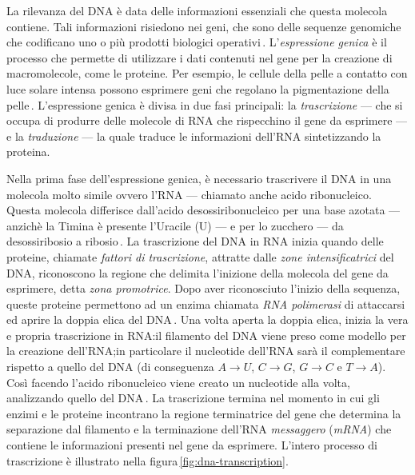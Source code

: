 La rilevanza del DNA è data delle informazioni essenziali che questa molecola contiene. Tali informazioni risiedono nei geni, che sono delle sequenze genomiche che codificano uno o più prodotti biologici operativi\,\cite{gerstein2007gene}. L'\textsl{espressione genica} è il processo che permette di utilizzare i dati contenuti nel gene per la creazione di macromolecole, come le proteine. Per esempio, le cellule della pelle a contatto con luce solare intensa possono esprimere geni che regolano la pigmentazione della pelle\,\cite{white2009gene}. L'espressione genica è divisa in due fasi principali: la \textsl{trascrizione} — che si occupa di produrre delle molecole di RNA che rispecchino il gene da esprimere — e la \textsl{traduzione} — la quale traduce le informazioni dell'RNA sintetizzando la proteina.

Nella prima fase dell'espressione genica, è necessario trascrivere il DNA in una molecola molto simile ovvero l'RNA — chiamato anche acido ribonucleico. Questa molecola differisce dall'acido desossiribonucleico per una base azotata — anzichè la Timina è presente l'Uracile (U) — e per lo zucchero — da desossiribosio a ribosio\,\cite{alberts2002dna}. La trascrizione del DNA in RNA inizia quando delle proteine, chiamate \textsl{fattori di trascrizione}, attratte dalle \textsl{zone intensificatrici} del DNA, riconoscono la regione che delimita l'inizione della molecola del gene da esprimere, detta \textsl{zona promotrice}. Dopo aver riconosciuto l'inizio della sequenza, queste proteine permettono ad un enzima chiamata \textsl{RNA polimerasi} di attaccarsi ed aprire la doppia elica del DNA\,\cite{cramer2019organization}. Una volta aperta la doppia elica, inizia la vera e propria trascrizione in RNA:\@ il filamento del DNA viene preso come modello per la creazione dell'RNA;\@ in particolare il nucleotide dell'RNA sarà il complementare rispetto a quello del DNA (di conseguenza $A\rightarrow U$, $C\rightarrow G$, $G\rightarrow C$ e $T\rightarrow A$). Così facendo l'acido ribonucleico viene creato un nucleotide alla volta, analizzando quello del DNA\,\cite{alberts2002dna}. La trascrizione termina nel momento in cui gli enzimi e le proteine incontrano la regione terminatrice del gene che determina la separazione dal filamento e la terminazione dell'RNA \textsl{messaggero} (\textsl{mRNA}) che contiene le informazioni presenti nel gene da esprimere. L'intero processo di trascrizione è illustrato nella figura\,\ref{fig:dna-transcription}.

